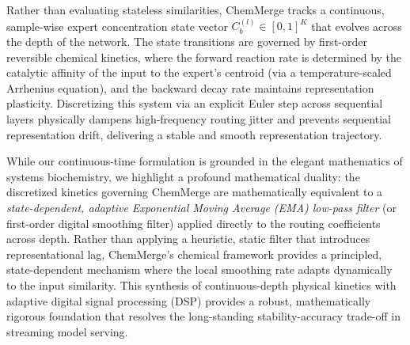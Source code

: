 Rather than evaluating stateless similarities, ChemMerge tracks a continuous, sample-wise expert concentration state vector $C_b^{(l)} \in [0, 1]^K$ that evolves across the depth of the network. The state transitions are governed by first-order reversible chemical kinetics, where the forward reaction rate is determined by the catalytic affinity of the input to the expert's centroid (via a temperature-scaled Arrhenius equation), and the backward decay rate maintains representation plasticity. Discretizing this system via an explicit Euler step across sequential layers physically dampens high-frequency routing jitter and prevents sequential representation drift, delivering a stable and smooth representation trajectory.

While our continuous-time formulation is grounded in the elegant mathematics of systems biochemistry, we highlight a profound mathematical duality: the discretized kinetics governing ChemMerge are mathematically equivalent to a \emph{state-dependent, adaptive Exponential Moving Average (EMA) low-pass filter} (or first-order digital smoothing filter) applied directly to the routing coefficients across depth. Rather than applying a heuristic, static filter that introduces representational lag, ChemMerge's chemical framework provides a principled, state-dependent mechanism where the local smoothing rate adapts dynamically to the input similarity. This synthesis of continuous-depth physical kinetics with adaptive digital signal processing (DSP) provides a robust, mathematically rigorous foundation that resolves the long-standing stability-accuracy trade-off in streaming model serving.

